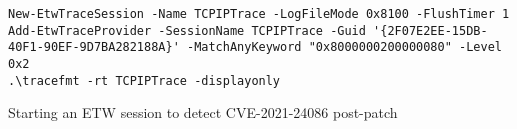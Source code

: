 \documentclass{report}
\begin{document}
\begin{listing}[H]
    \begin{verbatim}
New-EtwTraceSession -Name TCPIPTrace -LogFileMode 0x8100 -FlushTimer 1
Add-EtwTraceProvider -SessionName TCPIPTrace -Guid '{2F07E2EE-15DB-40F1-90EF-9D7BA282188A}' -MatchAnyKeyword "0x8000000200000080" -Level 0x2
.\tracefmt -rt TCPIPTrace -displayonly
\end{verbatim}
\caption{Starting an \gls{ETW} session to detect CVE-2021-24086 post-patch}
\label{listing:detection:etw:detection-post-patch:commands}
\end{listing}
\end{document}
